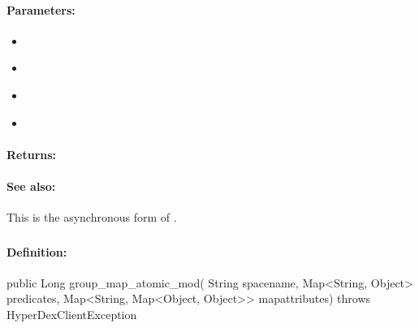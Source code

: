 \paragraph{Parameters:}
\begin{itemize}[noitemsep]
\item {}\\

\item {}\\

\item {}\\

\item {}\\

\end{itemize}

\paragraph{Returns:}


\paragraph{See also:}  This is the asynchronous form of .

\pagebreak
\subsubsection{}
\label{api:java:group_map_atomic_mod}


\paragraph{Definition:}
\begin{javacode}
public Long group_map_atomic_mod(
        String spacename,
        Map<String, Object> predicates,
        Map<String, Map<Object, Object>> mapattributes) throws HyperDexClientException
\end{javacode}

